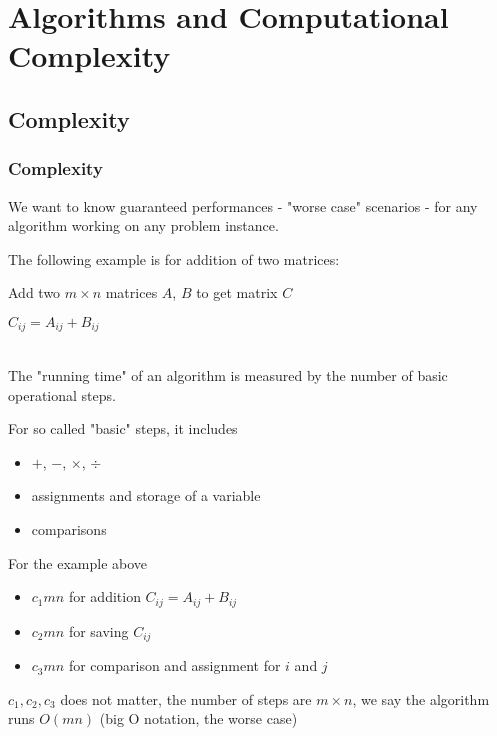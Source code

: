 \part{Algorithms and Computational Complexity}
	\chapter{Complexity}
		\section{Complexity}
			 We want to know guaranteed performances - "worse case" scenarios -  for any algorithm working on any problem instance.

			The following example is for addition of two matrices: \\
			\begin{algorithm}[!ht]
				\caption{Add two $m \times n$ matrices $A$, $B$ to get matrix $C$}
				\begin{algorithmic}
							\STATE $C_{ij} = A_{ij} + B_{ij}$
						\ENDFOR
					\ENDFOR
				\end{algorithmic}				
			\end{algorithm}\\

			The "running time" of an algorithm is measured by the number of basic operational steps.

			For so called "basic" steps, it includes
			\begin{itemize}
				\item $+$, $-$, $\times$, $\div$
				\item assignments and storage of a variable
				\item comparisons
			\end{itemize}

			For the example above
			\begin{itemize}
				\item $c_1 m n$ for addition $C_{ij} = A_{ij} + B_{ij}$
				\item $c_2 m n$ for saving $C_{ij}$
				\item $c_3 m n$ for comparison and assignment for $i$ and $j$
			\end{itemize}
			$c_1, c_2, c_3$ does not matter, the number of steps are $m \times n$, we say the algorithm runs $O(mn)$ (big O notation, the worse case)

